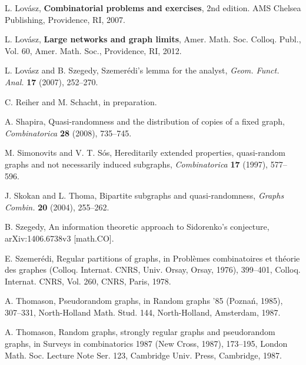 \documentclass[11pt]{article}
\begin{document}
\begin{thebibliography}{}
L. Lov\'asz, {\bf Combinatorial problems and exercises}, 2nd edition. AMS Chelsea Publishing, Providence, RI, 2007.

L. Lov\'asz, {\bf Large networks and graph limits}, Amer. Math. Soc. Colloq. Publ., Vol. 60, Amer. Math. Soc., Providence, RI, 2012.

L. Lov\'asz and B. Szegedy, Szemer\'edi's lemma for the analyst, {\it Geom. Funct. Anal.} {\bf 17} (2007), 252--270. 

C. Reiher and M. Schacht, in preparation. 

{A. Shapira,} {Quasi-randomness and the distribution of copies of a fixed graph,} {\it Combinatorica} {\bf 28} (2008), 735--745.

{M. Simonovits and V. T. S\'os,} {Hereditarily extended properties, quasi-random graphs and not necessarily induced subgraphs,} {\it Combinatorica} {\bf 17} (1997), 577--596.

{J. Skokan and L. Thoma,} {Bipartite subgraphs and quasi-randomness,} {\it Graphs Combin.} {\bf 20} (2004), 255--262.

B. Szegedy, An information theoretic approach to Sidorenko's conjecture, arXiv:1406.6738v3 {[}math.CO{]}.

E. Szemer\'edi, Regular partitions of graphs, in Probl\`emes combinatoires et th\'eorie des graphes (Colloq. Internat. CNRS, Univ. Orsay, Orsay, 1976), 399--401, Colloq. Internat. CNRS, Vol. 260, CNRS, Paris, 1978.

A. Thomason, Pseudorandom graphs, in {Random graphs '85} (Pozna\'n, 1985), 307--331, 
North-Holland Math. Stud. 144, North-Holland, Amsterdam, 1987.

A. Thomason, Random graphs, strongly regular graphs and pseudorandom graphs, in Surveys in combinatorics 1987 (New Cross, 1987), 173--195, 
London Math. Soc. Lecture Note Ser. 123, Cambridge Univ. Press, Cambridge, 1987. 

\end{thebibliography}
\end{document}
